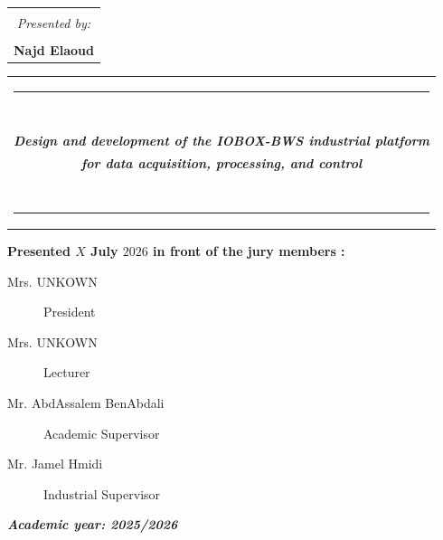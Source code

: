 \begin{titlepage}
\begin{center}
\begin{tabular}{lcr}
\multicolumn{3}{c}{\emph{   }}  \\

\multicolumn{3}{c}{\emph{ Presented by:}}\\
\multicolumn{3}{c}{\emph{   }}  \\
\multicolumn{3}{c}{\textbf{ {\huge Najd Elaoud}}}\\
\end{tabular}
\vspace*{0.05cm}

\begin{tabular}{lcr}
	\multicolumn{3}{c}{\rule{\linewidth}{4pt}}\\
	\multicolumn{3}{c}{\huge  ~}\\
	\multicolumn{3}{c}{\textbf{\textit{Design and development of the IOBOX-BWS industrial platform
 }}} \\
 	\multicolumn{3}{c}{\textbf{\textit{  for data acquisition, processing, and control}}}\\
	\multicolumn{3}{c}{\huge  ~} \\
	\multicolumn{3}{c}{\rule{\linewidth}{4pt}}
\end{tabular}


\textbf{Presented $X$ July $2026$ in front of the jury members :}
\vspace*{1cm}
\begin{normalsize}
	\begin{description}
	\item [Mrs. UNKOWN \hspace{0.75cm}  ]\hfill  President 
	\item [Mrs. UNKOWN   \hspace{0.75cm}   ] \hfill Lecturer 
	\item [Mr. AbdAssalem BenAbdali   \hspace{0.75cm} ] \hfill  Academic Supervisor 
	\item [Mr. Jamel Hmidi   \hspace{0.75cm}] \hfill  Industrial Supervisor 
	\end{description}
\end{normalsize}

\vfill
\hrulefill \small{\textbf{\textit{\hspace*{0.3cm} Academic year: 2025/2026\hspace*{0.3cm}}}} \hrulefill
\end{center}


\end{titlepage}




